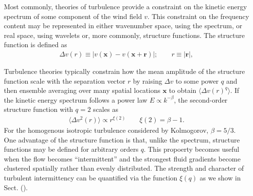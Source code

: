 \documentclass[acp, manuscript, english]{copernicus}
\begin{document}
Most commonly, theories of turbulence provide a constraint on the kinetic energy spectrum of some component of the wind field $v$. This constraint on the frequency content may be represented in either wavenumber space, using the spectrum, or real space, using wavelets or, more commonly, structure functions. The structure function is defined as 
\begin{align}
  \Delta v (r)\equiv \big|v(\mathbf{x})-v(\mathbf{x}+\mathbf{r})\big|; \qquad r \equiv |\mathbf{r}|,
\end{align}

Turbulence theories typically constrain how the mean amplitude of the structure function scale with the separation vector $r$ by raising $\Delta v$ to some power $q$ and then ensemble averaging over many spatial locations $\mathbf{x}$ to obtain $\langle \Delta v (r)^q\rangle$.
If the kinetic energy spectrum follows a power law $E\propto k^{-\beta}$, the second-order structure function with $q=2$ scales as \begin{align}
  \langle\Delta v^2 (r)\rangle\propto r^{\xi(2)}\qquad \xi(2) = \beta - 1. \label{eq:isotropic KE structure function}
\end{align}
For the homogenous isotropic turbulence considered by Kolmogorov, $\beta =5/3$.
One advantage of the structure function is that, unlike the spectrum, structure functions may be defined for arbitrary orders $q$. This propoerty becomes useful when the flow becomes ``intermittent'' and the strongest fluid gradients become clustered spatially rather than evenly distributed. The strength and character of turbulent intermittency can be quantified via the function $\xi(q)$ as we show in Sect. (). 
\end{document}
